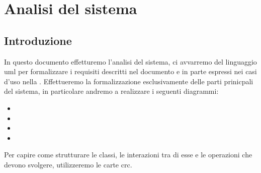 \chapter{Analisi del sistema}

\section{Introduzione}
In questo documento effetturemo l'analisi del sistema, ci avvarremo del linguaggio \gls{uml} per formalizzare i requisiti descritti nel documento  e in parte espressi nei casi d'uso nella .
Effettueremo la formalizzazione esclusivamente delle parti prinicpali del sistema, in particolare andremo a realizzare i seguenti diagrammi:
\begin{itemize}
	\item {}
	\item {}
	\item {}
	\item {}
\end{itemize}
Per capire come strutturare le classi, le interazioni tra di esse e le operazioni che devono svolgere, utilizzeremo le carte \gls{crc}.

